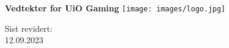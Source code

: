 \begin{titlepage}
\begin{center}
    \vspace*{1cm}

    \Huge
    \textbf{Vedtekter for UiO Gaming}
    \vspace{1cm}
    \vspace{3cm}
    \texttt{[image: images/logo.jpg]}
    \vspace{7cm}

    \LARGE
    Sist revidert:\\
    12.09.2023
\end{center}
\end{titlepage}
